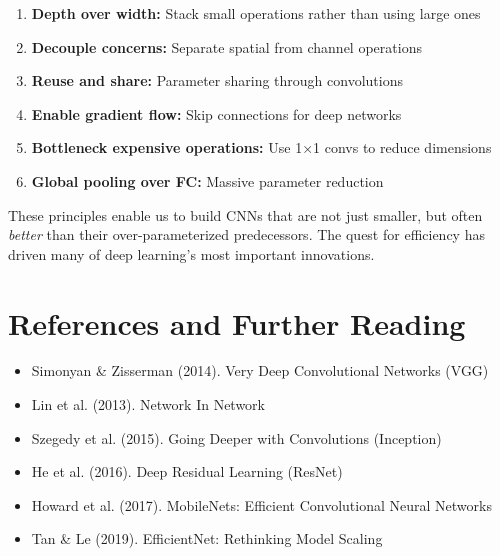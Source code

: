 \documentclass{article}
\begin{document}
\begin{tcolorbox}[colback=green!5!white, colframe=green!50!black, title=Key Takeaways]
\begin{enumerate}
    \item \textbf{Depth over width:} Stack small operations rather than using large ones
    \item \textbf{Decouple concerns:} Separate spatial from channel operations
    \item \textbf{Reuse and share:} Parameter sharing through convolutions
    \item \textbf{Enable gradient flow:} Skip connections for deep networks
    \item \textbf{Bottleneck expensive operations:} Use 1×1 convs to reduce dimensions
    \item \textbf{Global pooling over FC:} Massive parameter reduction
\end{enumerate}
\end{tcolorbox}

These principles enable us to build CNNs that are not just smaller, but often \textit{better} than their over-parameterized predecessors. The quest for efficiency has driven many of deep learning's most important innovations.

\section{References and Further Reading}

\begin{itemize}
    \item Simonyan \& Zisserman (2014). Very Deep Convolutional Networks (VGG)
    \item Lin et al. (2013). Network In Network
    \item Szegedy et al. (2015). Going Deeper with Convolutions (Inception)
    \item He et al. (2016). Deep Residual Learning (ResNet)
    \item Howard et al. (2017). MobileNets: Efficient Convolutional Neural Networks
    \item Tan \& Le (2019). EfficientNet: Rethinking Model Scaling
\end{itemize}
\end{document}
